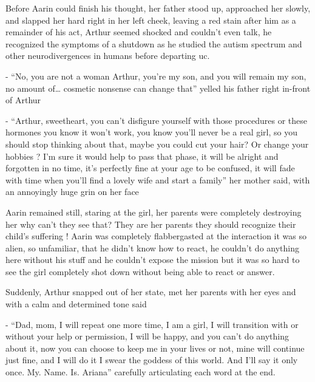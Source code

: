 \documentclass[colorlinks,12pt,a4paper]{book}
\begin{document}
Before Aarin could finish his thought, her father stood up, approached her slowly, and slapped her 
hard right in her left cheek, leaving a red stain after him as a remainder of his act, 
Arthur seemed shocked and couldn't even talk, he recognized the symptoms of a shutdown as he studied the 
autism spectrum and other neurodivergences in humans before departing \gls{uc}. \par
\bigskip

- “No, you are not a woman Arthur, you're my son, and you will remain my son, no amount of… 
cosmetic nonsense can change that” yelled his father right in-front of Arthur\newline

- “Arthur, sweetheart, you can't disfigure yourself with those procedures or 
these hormones you know it won't work, you know you'll never be a real girl, so you should stop
 thinking about that, maybe you could cut your hair? Or change your hobbies ? I'm sure it would help to pass that phase, 
 it will be alright and forgotten in no time, it's perfectly fine at your age to be confused, it will fade with
  time when you'll find a lovely wife and start a family” her mother said, with an annoyingly huge grin on her face\par
  \bigskip

Aarin remained still, staring at the girl, her parents were completely destroying her why can't they see that? 
They are her parents they should recognize their child's suffering ! Aarin was completely flabbergasted at the 
interaction it was so alien, so unfamiliar, that he didn't know how to react, he couldn't do anything here without his 
stuff and he couldn't expose the mission but it was so hard to see the girl completely shot down without being able 
to react or answer.\par
\bigskip

Suddenly, Arthur snapped out of her state, met her parents with her eyes and with a calm and determined tone said\newline

- “Dad, mom, I will repeat one more time, I am a girl, I will transition with or without your help or permission, 
I will be happy, and you can't do anything about it, now you can choose to keep me in your lives or not,
 mine will continue just fine, and I will do it I swear the goddess of this world. And I'll say it only once. 
 My. Name. Is. Ariana” carefully articulating each word at the end.\par
 \bigskip
\end{document}
